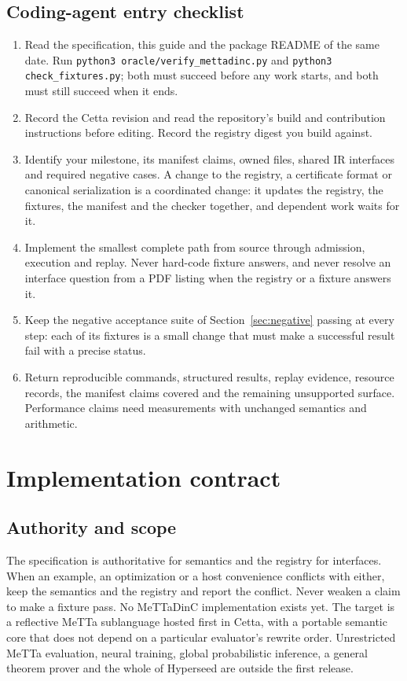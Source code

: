 \documentclass[11pt]{article}
\newcommand{\code}[1]{\texttt{#1}}
\begin{document}
\subsection*{Coding-agent entry checklist}
\begin{enumerate}
\item Read the specification, this guide and the package README of the same date. Run
\code{python3 oracle/verify\_mettadinc.py} and \code{python3 check\_fixtures.py}; both must succeed
before any work starts, and both must still succeed when it ends.
\item Record the Cetta revision and read the repository's build and contribution instructions before
editing. Record the registry digest you build against.
\item Identify your milestone, its manifest claims, owned files, shared IR interfaces and required
negative cases. A change to the registry, a certificate format or canonical serialization is a
coordinated change: it updates the registry, the fixtures, the manifest and the checker together, and
dependent work waits for it.
\item Implement the smallest complete path from source through admission, execution and replay. Never
hard-code fixture answers, and never resolve an interface question from a PDF listing when the
registry or a fixture answers it.
\item Keep the negative acceptance suite of Section~\ref{sec:negative} passing at every step: each of its
fixtures is a small change that must make a successful result fail with a precise status.
\item Return reproducible commands, structured results, replay evidence, resource records, the
manifest claims covered and the remaining unsupported surface. Performance claims need measurements
with unchanged semantics and arithmetic.
\end{enumerate}

\tableofcontents
\clearpage

\section{Implementation contract}\label{sec:contract}

\subsection{Authority and scope}

The specification is authoritative for semantics and the registry for interfaces. When an example,
an optimization or a host convenience conflicts with either, keep the semantics and the registry and
report the conflict. Never weaken a claim to make a fixture pass. No MeTTaDinC implementation exists
yet. The target is a reflective MeTTa sublanguage hosted first in Cetta, with a portable semantic
core that does not depend on a particular evaluator's rewrite order. Unrestricted MeTTa evaluation,
neural training, global probabilistic inference, a general theorem prover and the whole of Hyperseed
are outside the first release.
\end{document}
